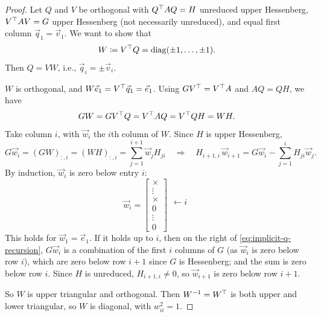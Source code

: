 \begin{proof}
  Let $Q$ and $V$ be orthogonal with $Q^\top AQ = H$ unreduced upper Hessenberg, $V^\top AV = G$ upper Hessenberg (not necessarily unreduced), and equal first column $\vec{q}_1 = \vec{v}_1$. We want to show that
  \begin{equation}
    W \coloneqq V^\top Q = \operatorname{diag}(\pm 1, \dots, \pm 1).
  \end{equation}
  Then $Q = VW$, i.e., $\vec{q}_i = \pm\vec{v}_i$.

  $W$ is orthogonal, and $W\vec{e}_1 = V^\top\vec{q}_1 = \vec{e}_1$. Using $GV^\top = V^\top A$ and $AQ = QH$, we have
  \begin{equation}
    GW = GV^\top Q = V^\top AQ = V^\top QH = WH.
  \end{equation}
  Take column $i$, with $\vec{w}_i$ the $i$th column of $W$. Since $H$ is upper Hessenberg,
  \begin{equation}
    G\vec{w}_i = (GW)_{:,i} = (WH)_{:,i} = \sum_{j=1}^{i+1}\vec{w}_jH_{ji}
    \quad\Longrightarrow\quad
    H_{i+1,i}\,\vec{w}_{i+1} = G\vec{w}_i - \sum_{j=1}^{i}H_{ji}\vec{w}_j.
    \label{eq:implicit-q-recursion}
  \end{equation}
  By induction, $\vec{w}_i$ is zero below entry $i$:
  \begin{equation}
    \vec{w}_i = \begin{bmatrix} \times \\ \vdots \\ \times \\ 0 \\ \vdots \\ 0 \end{bmatrix} \begin{matrix} \\ \\ \leftarrow i \\ \\ \\ \\ \end{matrix}
  \end{equation}
  This holds for $\vec{w}_1 = \vec{e}_1$. If it holds up to $i$, then on the right of \eqref{eq:implicit-q-recursion}, $G\vec{w}_i$ is a combination of the first $i$ columns of $G$ (as $\vec{w}_i$ is zero below row $i$), which are zero below row $i + 1$ since $G$ is Hessenberg; and the sum is zero below row $i$. Since $H$ is unreduced, $H_{i+1,i} \ne 0$, so $\vec{w}_{i+1}$ is zero below row $i + 1$.

  So $W$ is upper triangular and orthogonal. Then $W^{-1} = W^\top$ is both upper and lower triangular, so $W$ is diagonal, with $w_{ii}^2 = 1$.
\end{proof}

